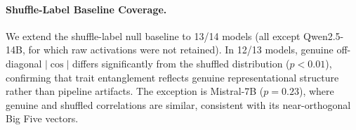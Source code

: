 \documentclass{article}
\begin{document}
\paragraph{Shuffle-Label Baseline Coverage.} We extend the shuffle-label null baseline to 13/14 models (all except Qwen2.5-14B, for which raw activations were not retained). In 12/13 models, genuine off-diagonal $|\cos|$ differs significantly from the shuffled distribution ($p{<}0.01$), confirming that trait entanglement reflects genuine representational structure rather than pipeline artifacts. The exception is Mistral-7B ($p{=}0.23$), where genuine and shuffled correlations are similar, consistent with its near-orthogonal Big Five vectors.
\end{document}

